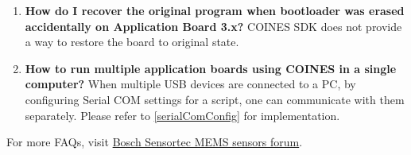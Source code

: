 \begin{enumerate}
\item \textbf{How do I recover the original program when bootloader was erased accidentally on Application Board 3.x?}
\newline COINES SDK does not provide a way to restore the board to original state.

\item \textbf{How to run multiple application boards using COINES in a single computer?}
\newline When multiple USB devices are connected to a PC, by configuring Serial COM settings for a script, one can communicate with them separately. Please refer to \ref{serialComConfig} for implementation.

\end{enumerate}
For more FAQs, visit \href{https://community.bosch-sensortec.com/t5/MEMS-sensors-forum/bd-p/bst_community-mems-forum}{Bosch Sensortec MEMS sensors forum}.
